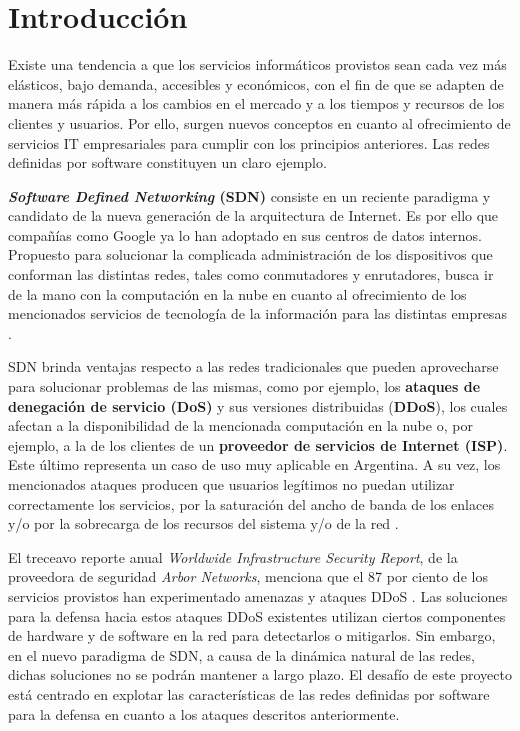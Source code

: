 \chapter{Introducción} %

\label{Chapter1} %

Existe una tendencia a que los servicios informáticos provistos sean cada vez más elásticos, bajo demanda, accesibles y económicos, con el fin de que se adapten de manera más rápida a los cambios en el mercado y a los tiempos y recursos de los clientes y usuarios. Por ello, surgen nuevos conceptos en cuanto al ofrecimiento de servicios IT empresariales para cumplir con los principios anteriores. Las redes definidas por software constituyen un claro ejemplo. 

\textbf{\textit{Software Defined Networking} (SDN)} consiste en un reciente paradigma y candidato de la nueva generación de la arquitectura de Internet. Es por ello que compañías como Google ya lo han adoptado en sus centros de datos internos. Propuesto para solucionar la complicada administración de los dispositivos que conforman las distintas redes, tales como conmutadores y enrutadores, busca ir de la mano con la computación en la nube en cuanto al ofrecimiento de los mencionados servicios de tecnología de la información para las distintas empresas \parencite{provicion_it}.

SDN brinda ventajas respecto a las redes tradicionales que pueden aprovecharse para solucionar problemas de las mismas, como por ejemplo, los \textbf{ataques de denegación de servicio (DoS)} y sus versiones distribuidas (\textbf{DDoS}), los cuales afectan a la disponibilidad de la mencionada computación en la nube o, por ejemplo, a la de los clientes de un \textbf{proveedor de servicios de Internet (ISP)}. Este último representa un caso de uso muy aplicable en Argentina. A su vez, los mencionados ataques producen que usuarios legítimos no puedan
utilizar correctamente los servicios, por la saturación del ancho de banda de
los enlaces y/o por la sobrecarga de los recursos del sistema y/o de la
red \parencite{autoscaling}.


El treceavo reporte anual \textit{Worldwide Infrastructure Security Report}, de
la proveedora de seguridad \textit{Arbor Networks}, menciona que el 87 por
ciento de los servicios provistos han experimentado amenazas y ataques DDoS
\parencite{sec_report}. Las soluciones para la defensa hacia estos ataques DDoS
existentes utilizan ciertos componentes de hardware y de software en la red para
detectarlos o mitigarlos. Sin embargo, en el nuevo paradigma de SDN, a
causa de la dinámica natural de las redes, dichas soluciones no se podrán
mantener a largo plazo. El desafío de este proyecto está centrado en explotar
las características de las redes definidas por software para la defensa en
cuanto a los ataques descritos anteriormente. 

